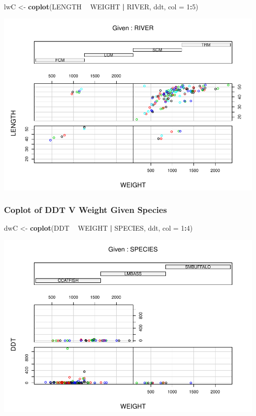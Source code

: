 \documentclass[]{article}
\newenvironment{Shaded}{\begin{snugshade}}{\end{snugshade}}
\newcommand{\KeywordTok}[1]{\textcolor[rgb]{0.13,0.29,0.53}{\textbf{#1}}}
\newcommand{\DataTypeTok}[1]{\textcolor[rgb]{0.13,0.29,0.53}{#1}}
\newcommand{\DecValTok}[1]{\textcolor[rgb]{0.00,0.00,0.81}{#1}}
\newcommand{\StringTok}[1]{\textcolor[rgb]{0.31,0.60,0.02}{#1}}
\newcommand{\OperatorTok}[1]{\textcolor[rgb]{0.81,0.36,0.00}{\textbf{#1}}}
\newcommand{\NormalTok}[1]{#1}
\begin{document}
\begin{Shaded}
\begin{Highlighting}[]
\NormalTok{lwC <-}\StringTok{ }\KeywordTok{coplot}\NormalTok{(LENGTH }\OperatorTok{~}\StringTok{ }\NormalTok{WEIGHT }\OperatorTok{|}\StringTok{ }\NormalTok{RIVER, ddt, }\DataTypeTok{col =} \DecValTok{1}\OperatorTok{:}\DecValTok{5}\NormalTok{)}
\end{Highlighting}
\end{Shaded}

\includegraphics{./tex2pdf.5760/3d822581eee1475eaa20210879504de9c1bd19ee.pdf}

\subsubsection{Coplot of DDT V Weight Given
Species}\label{coplot-of-ddt-v-weight-given-species}

\begin{Shaded}
\begin{Highlighting}[]
\NormalTok{dwC <-}\StringTok{ }\KeywordTok{coplot}\NormalTok{(DDT }\OperatorTok{~}\StringTok{ }\NormalTok{WEIGHT }\OperatorTok{|}\StringTok{ }\NormalTok{SPECIES, ddt, }\DataTypeTok{col =} \DecValTok{1}\OperatorTok{:}\DecValTok{4}\NormalTok{)}
\end{Highlighting}
\end{Shaded}

\includegraphics{./tex2pdf.5760/de0599460e2cb76baca25f3fd5f6342764238793.pdf}
\end{document}

